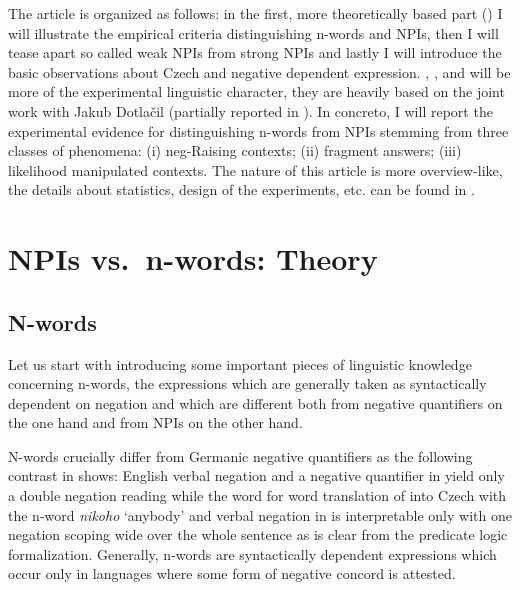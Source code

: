 \documentclass[output=paper,
]{langscibook}
\begin{document}
\noindent The article is organized as follows: in the first, more theoretically based part () I will illustrate the empirical criteria distinguishing n-words and NPIs, then I will tease apart so called weak NPIs from strong NPIs and lastly I will introduce the basic observations about Czech and negative dependent expression.  , , and  will be more of the experimental linguistic character, they are heavily based on the joint work with Jakub Dotlačil (partially reported in \citealt{dovcekal2016experimentala,docekaldotlacilsubedinb,docekaldotlacilsubber}). In concreto, I will report the experimental evidence for distinguishing n-words from NPIs stemming from three classes of phenomena: (i) neg-Raising contexts; (ii) fragment answers; (iii) likelihood manipulated contexts. The nature of this article is more overview-like, the details about statistics, design of the experiments, etc. can be found in \cite{dovcekal2016experimentala,docekaldotlacilsubedinb,docekaldotlacilsubber,docekalsafratovaoli}.

\section{NPIs vs.~n-words: Theory}\label{npis-vs.n-words-theory}

\subsection{N-words}\label{n-words}

Let us start with introducing some important pieces of linguistic knowledge concerning n-words, the expressions which are generally taken as syntactically dependent on negation and which are different both from negative quantifiers on the one hand and from NPIs on the other hand.

N-words crucially differ from Germanic negative quantifiers as the following contrast in  shows: English verbal negation and a negative quantifier in  yield only a double negation reading while the word for word translation of  into Czech with the n-word \textit{nikoho} `anybody' and verbal negation in  is interpretable only with one negation scoping wide over the whole sentence as is clear from the predicate logic formalization. Generally, n-words are syntactically dependent expressions which occur only in languages where some form of negative concord is attested.
\end{document}
